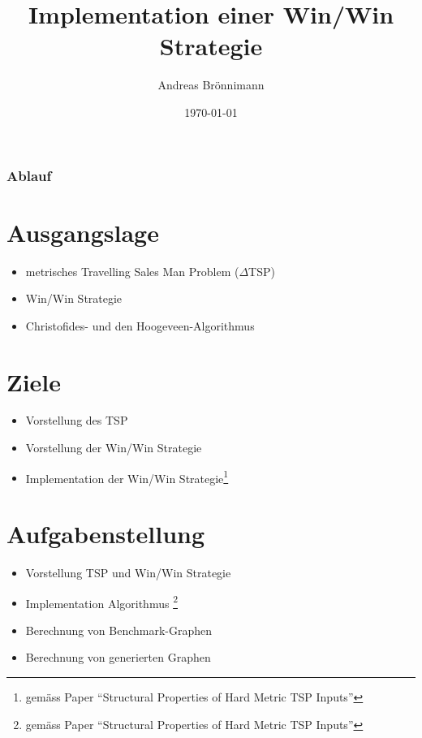 \documentclass[12pt]{beamer}
\title[Kick-Off Semesterarbeit]{Implementation einer Win/Win Strategie}
\author{Andreas Brönnimann}
\institute{Hochschule für Technik Zürich}
\date{\today}
\begin{document}
    \begin{frame}
        \titlepage
    \end{frame}

    \begin{frame}
        \frametitle{Ablauf}
        \tableofcontents
    \end{frame}

	\section{Ausgangslage}
	\begin{frame}
		\begin{itemize}
			\item metrisches Travelling Sales Man Problem ($\Delta$TSP)
			\item Win/Win Strategie
			\item Christofides- und den Hoogeveen-Algorithmus
		\end{itemize}
    \end{frame}

	\section{Ziele}
	\begin{frame}
		\begin{itemize}
			\item Vorstellung des TSP
			\item Vorstellung der Win/Win Strategie
			\item Implementation der Win/Win Strategie\footnote{gemäss Paper "`Structural Properties of Hard Metric TSP Inputs"'}
		\end{itemize}
    \end{frame}

	\section{Aufgabenstellung}
	\begin{frame}
		\begin{itemize}
			\item Vorstellung TSP und Win/Win Strategie
			\item Implementation Algorithmus \footnote{gemäss Paper "`Structural Properties of Hard Metric TSP Inputs"'}
			\item Berechnung von Benchmark-Graphen
			\item Berechnung von generierten Graphen
		\end{itemize}
    \end{frame}
\end{document}
